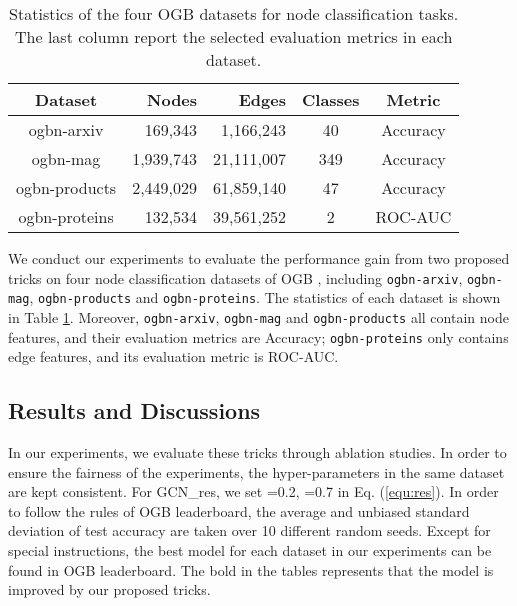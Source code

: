\documentclass[runningheads]{llncs}
\begin{document}
\begin{table}[htbp] 
\caption{Statistics of the four OGB datasets for node classification tasks. The last column report the selected evaluation metrics in each dataset.}
\label{table:dataset-statistics}
\begin{center} 
\renewcommand\tabcolsep{7.0pt}

\begin{tabular}{c|r|r|c|c}
\hline
\textbf{Dataset}  & \textbf{Nodes}  & \textbf{Edges} & \textbf{Classes} & \textbf{Metric} \\
\hline
\hline
ogbn-arxiv             & 169,343     & 1,166,243   &   40     & Accuracy \\
ogbn-mag         & 1,939,743 & 21,111,007 & 349 & Accuracy \\
ogbn-products          & 2,449,029   & 61,859,140	    & 47 &Accuracy \\
ogbn-proteins          & 132,534	    & 39,561,252    &  2  & ROC-AUC \\
\hline
\end{tabular} 


\end{center}
\end{table}

We conduct our experiments to evaluate the performance gain from two proposed tricks on four node classification datasets of OGB \cite{hu2020open}, including
\texttt{ogbn-arxiv}, \texttt{ogbn-mag}, \texttt{ogbn-products} and
\texttt{ogbn-proteins}. The statistics of each dataset is
shown in Table \ref{table:dataset-statistics}. Moreover, \texttt{ogbn-arxiv}, \texttt{ogbn-mag} and \texttt{ogbn-products} all contain node features,
and their evaluation metrics are Accuracy;
\texttt{ogbn-proteins} only contains edge features, and its
evaluation metric is ROC-AUC.

\subsection{Results and
Discussions}

In our experiments, we evaluate these tricks through ablation studies. In order to ensure the
fairness of the experiments, the hyper-parameters in the same dataset
are kept consistent. For GCN\_res, we set =0.2, =0.7 in Eq. (\ref{equ:res}). In order to follow the rules of OGB leaderboard, 
the average and unbiased standard deviation of test accuracy are
taken over 10 different random seeds. Except for special
instructions, the best model for each dataset in our experiments can be
found in OGB leaderboard. The bold in the tables represents that 
the model is improved by our proposed tricks.
\end{document}
